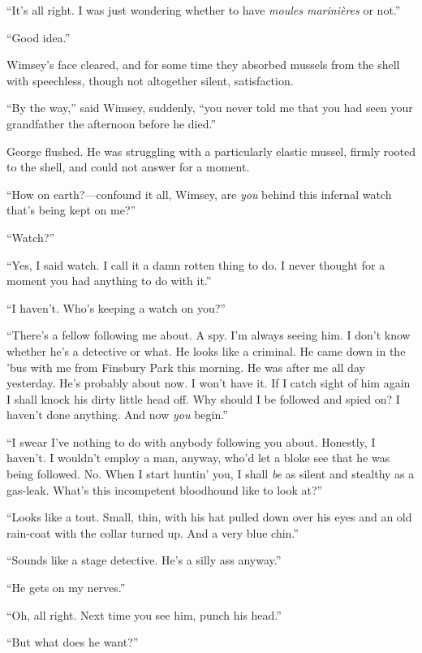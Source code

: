 \enquote{It's all right. I was just wondering whether to have \textit{moules marinières} or not.}

\enquote{Good idea.}

Wimsey's face cleared, and for some time they absorbed mussels from the shell with speechless, though not altogether silent, satisfaction.

\enquote{By the way,} said Wimsey, suddenly, \enquote{you never told me that you had seen your grandfather the afternoon before he died.}

George flushed. He was struggling with a particularly elastic mussel, firmly rooted to the shell, and could not answer for a moment.

\enquote{How on earth?---confound it all, Wimsey, are \textit{you} behind this infernal watch that's being kept on me?}

\enquote{Watch?}

\enquote{Yes, I said watch. I call it a damn rotten thing to do. I never thought for a moment you had anything to do with it.}

\enquote{I haven't. Who's keeping a watch on you?}

\enquote{There's a fellow following me about. A spy. I'm always seeing him. I don't know whether he's a detective or what. He looks like a criminal. He came down in the 'bus with me from Finsbury Park this morning. He was after me all day yesterday. He's probably about now. I won't have it. If I catch sight of him again I shall knock his dirty little head off. Why should I be followed and spied on? I haven't done anything. And now \textit{you} begin.}

\enquote{I swear I've nothing to do with anybody following you about. Honestly, I haven't. I wouldn't employ a man, anyway, who'd let a bloke see that he was being followed. No. When I start huntin' you, I shall \textit{be} as silent and stealthy as a gas-leak. What's this incompetent bloodhound like to look at?}

\enquote{Looks like a tout. Small, thin, with his hat pulled down over his eyes and an old rain-coat with the collar turned up. And a very blue chin.}

\enquote{Sounds like a stage detective. He's a silly ass anyway.}

\enquote{He gets on my nerves.}

\enquote{Oh, all right. Next time you see him, punch his head.}

\enquote{But what does he want?}

